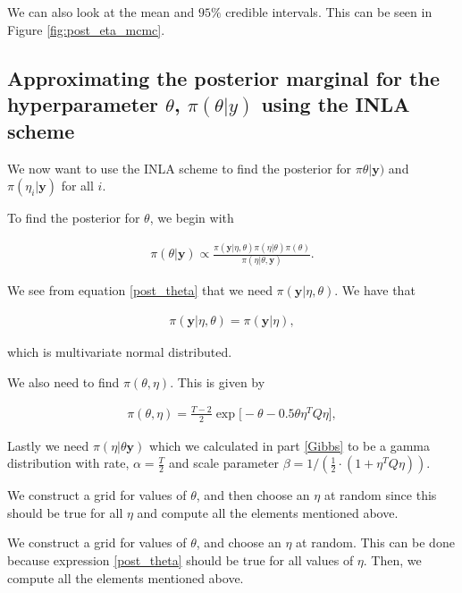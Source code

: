 We can also look at the mean and $95 \%$ credible intervals. This can be seen in Figure \ref{fig:post_eta_mcmc}.


\subsection{Approximating the posterior marginal for the hyperparameter $\theta$, $\pi(\theta|y)$ using the INLA scheme}
\label{theta_post_inla}

We now want to use the INLA scheme to find the posterior for $\pi\theta| \boldsymbol{y})$ and $\pi(\eta_i| \boldsymbol{y})$ for all $i$.


To find the posterior for $\theta$, we begin with

\begin{align}\label{post_theta}
    \pi(\theta|\mathbf{y}) \propto \frac{\pi(\mathbf{y}|\eta,\theta)\pi(\eta|\theta)\pi(\theta)}{\pi(\eta|\theta, \mathbf{y})}.
\end{align}

We see from equation \ref{post_theta} that we need $\pi(\boldsymbol{y}| \eta, \theta)$. We have that 

\begin{align}
    \pi(\mathbf{y}| \eta, \theta) = \pi(\mathbf{y}|\eta),  
\end{align}


which is multivariate normal distributed. 

We also need to find $\pi(\theta, \eta)$. This is given by 

\begin{align}
  \pi(\theta, \eta) = \frac{T-2}{2} \exp\bigg[-\theta - 0.5 \theta \eta^T Q \eta\bigg], 
\end{align}

Lastly we need $\pi(\eta| \theta \boldsymbol{y})$ which we calculated in part \ref{Gibbs} to be a gamma distribution with rate, $\alpha = \frac{T}{2}$ and scale parameter $\beta = 1/(\frac{1}{2}\cdot (1 + \eta^T Q \eta))$.

We construct a grid for values of $\theta$, and then choose an $\eta$ at random since this should be true for all $\eta$ and compute all the elements mentioned above.  

We construct a grid for values of $\theta$, and choose an $\eta$ at random. This can be done because expression \eqref{post_theta} should be true for all values of $\eta$. Then, we compute all the elements mentioned above.  

